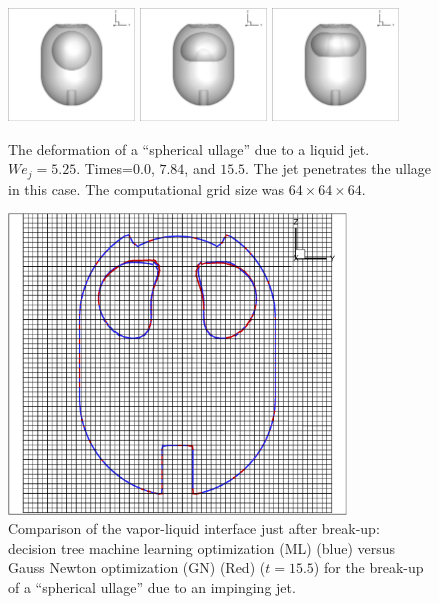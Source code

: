 \documentclass[]{article}
\begin{document}
\begin{figure}[htbp]
\centering

\includegraphics[width=0.3\textwidth]{3D_WEJ5p25_0.eps} 
\includegraphics[width=0.3\textwidth]{3D_WEJ5p25_400.eps} 
\includegraphics[width=0.3\textwidth]{3D_WEJ5p25_800.eps} 

\caption{The deformation of a ``spherical ullage'' due to a liquid jet.  
	$We_{j}=5.25$. 
	Times=$0.0$, $7.84$, and $15.5$.
	The jet penetrates the ullage in this
	case.  The computational grid size was $64\times 64\times 64$. }
 \label{3DWEJ5p25}
\end{figure}


\begin{figure}[htbp]
\centering

\includegraphics[width=0.8\textwidth]{MLBLUE_VS_GNRED.eps} 

\caption{
Comparison of the vapor-liquid interface just after break-up:
decision tree
machine learning optimization (ML) (blue) versus 
Gauss Newton 
optimization (GN) (Red) ($t=15.5$) 
for the break-up of a ``spherical ullage'' due
to an impinging jet.  }
 \label{ML_VS_GN}
\end{figure}
\end{document}
